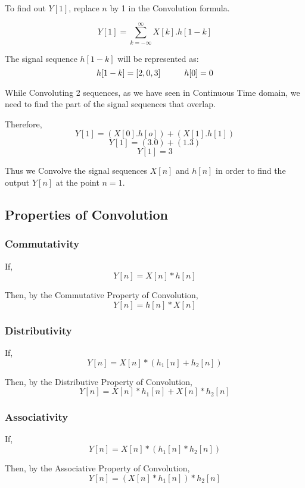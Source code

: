 To find out $Y[1]$, replace $n$ by 1 in the Convolution formula.

$$Y[1]=\sum_{k=-\infty}^{\infty} X[k].h[1-k]$$

The signal sequence $h[1-k]$ will be represented as:
$$h[1-k]=[2,0,3]\hspace{10mm}h[0]=0$$

While Convoluting 2 sequences, as we have seen in Continuous Time domain, we need to find the part of the signal sequences that overlap. 

Therefore,
$$Y[1]=(X[0].h[o])+(X[1].h[1])$$
$$Y[1]=(3.0)+(1.3)$$
$$Y[1]=3$$

Thus we Convolve the signal sequences $X[n]$ and $h[n]$ in order to find the output $Y[n]$ at the point $n=1$.

\subsection{Properties of Convolution}
\subsubsection{Commutativity}
If, $$Y[n]=X[n]*h[n]$$

Then, by the Commutative Property of Convolution, 
$$Y[n]=h[n]*X[n]$$

\subsubsection{Distributivity}

If, $$Y[n]=X[n]*(h_1[n]+h_2[n])$$

Then, by the Distributive Property of Convolution, 
$$Y[n]=X[n]*h_1[n]+X[n]*h_2[n]$$

\subsubsection{Associativity}

If, $$Y[n]=X[n]*(h_1[n]*h_2[n])$$

Then, by the Associative Property of Convolution, 
$$Y[n]=(X[n]*h_1[n])*h_2[n]$$





